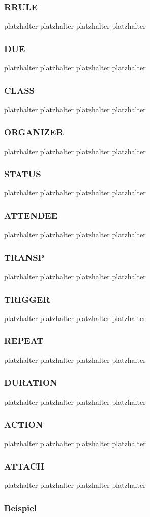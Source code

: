 \subsubsection{RRULE}
\label{sec:rrule}
platzhalter platzhalter platzhalter platzhalter 
\subsubsection{DUE}
\label{sec:due}
platzhalter platzhalter platzhalter platzhalter 
\subsubsection{CLASS}
\label{sec:class}
platzhalter platzhalter platzhalter platzhalter 
\subsubsection{ORGANIZER}
\label{sec:organizer}
platzhalter platzhalter platzhalter platzhalter 
\subsubsection{STATUS}
\label{sec:status}
platzhalter platzhalter platzhalter platzhalter 
\subsubsection{ATTENDEE}
\label{sec:attendee}
platzhalter platzhalter platzhalter platzhalter 
\subsubsection{TRANSP}
\label{sec:transp}
platzhalter platzhalter platzhalter platzhalter 
\subsubsection{TRIGGER}
\label{sec:trigger}
platzhalter platzhalter platzhalter platzhalter 
\subsubsection{REPEAT}
\label{sec:repeat}
platzhalter platzhalter platzhalter platzhalter 
\subsubsection{DURATION}
\label{sec:duration}
platzhalter platzhalter platzhalter platzhalter 
\subsubsection{ACTION}
\label{sec:action}
platzhalter platzhalter platzhalter platzhalter 
\subsubsection{ATTACH}
\label{sec:attach}
platzhalter platzhalter platzhalter platzhalter 
\subsubsection{Beispiel}
\label{sec:beispiel_ical}


